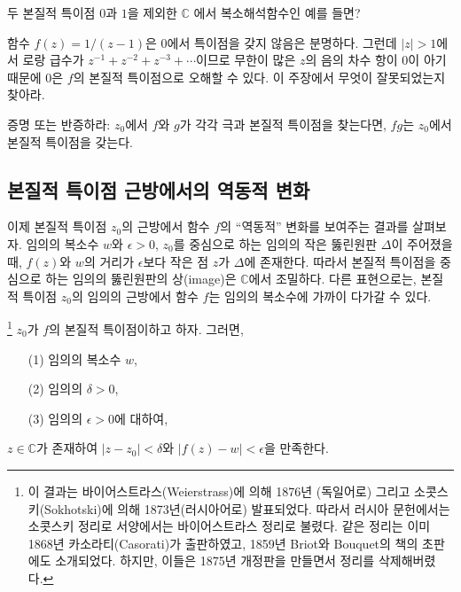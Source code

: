 \begin{salt_exercise}\label{ex-4-36}
두 본질적 특이점 $0$과 $1$을 제외한  $\mathbb C$ 에서
복소해석함수인 예를 들면?
\end{salt_exercise}

\begin{salt_exercise}\label{ex-4-37}
함수 $f(z) = 1/(z-1)$은 $0$에서 특이점을 갖지 않음은 분명하다.
그런데 $|z|>1$에서 로랑 급수가 $z^{-1} + z^{-2} + z^{-3} + \cdots$이므로
무한이 많은 $z$의 음의 차수 항이 $0$이 아기 때문에
$0$은 $f$의 본질적 특이점으로 오해할 수 있다. 
이 주장에서 무엇이 잘못되었는지 찾아라.
\end{salt_exercise}

\begin{salt_exercise}\label{ex-4-38}
증명 또는 반증하라:
$z_0$에서 $f$와 $g$가 각각 극과 본질적 특이점을 찾는다면,
$fg$는 $z_0$에서 본질적 특이점을 갖는다.
\end{salt_exercise}

\subsection{본질적 특이점 근방에서의 역동적 변화}

이제 본질적 특이점 $z_0$의 근방에서 함수 $f$의
``역동적'' 변화를 보여주는 결과를 살펴보자. 
임의의 복소수 $w$와 $\epsilon>0$, 
$z_0$를 중심으로 하는 임의의 작은 뚫린원판 $\Delta$이
주어졌을 때, 
$f(z)$와 $w$의 거리가 $\epsilon$보다 작은 점 $z$가
$\Delta$에 존재한다. 따라서
본질적 특이점을 중심으로 하는 임의의 뚫린원판의 상(image)은
$\mathbb C$에서 조밀하다.
다른 표현으로는, 본질적 특이점 $z_0$의 임의의 근방에서
함수 $f$는 임의의 복소수에 가까이 다가갈 수 있다.

\begin{salttheorem}  {}{}
\footnote{
이 결과는 바이어스트라스(Weierstrass)에 의해
1876년 (독일어로) 그리고
소콧스키(Sokhotski)에 의해 1873년(러시아어로) 발표되었다.
따라서 러시아 문헌에서는 소콧스키 정리로
서양에서는 바이어스트라스 정리로 불렸다. 
같은 정리는 이미 1868년 카소라티(Casorati)가 출판하였고,
1859년 Briot와 Bouquet의 책의 초판에도 소개되었다.
하지만, 이들은 1875년 개정판을 만들면서 정리를 삭제해버렸다.
} \label{thm-4-10}
$z_0$가 $f$의 본질적 특이점이하고 하자. 그러면,
\begin{itemize}
\item[(1)] 임의의 복소수 $w$,
\item[(2)] 임의의 $\delta>0$,
\item[(3)] 임의의 $\epsilon>0$에 대하여,
\end{itemize}
$z\in\mathbb C$가 존재하여
$|z-z_0| <\delta$와 $|f(z) - w| < \epsilon$을 만족한다.
\end{salttheorem}

